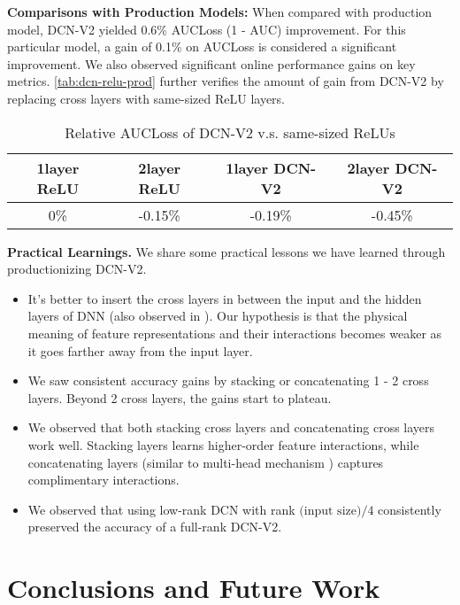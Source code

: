 \documentclass[sigconf]{acmart}
\begin{document}
{\bf Comparisons with Production Models:} When compared with production model, {DCN-V2} yielded 0.6\% AUCLoss (1 - AUC) improvement. For this particular model, a gain of 0.1\% on AUCLoss is considered a significant improvement.  We also observed significant online performance gains on key metrics.
\autoref{tab:dcn-relu-prod} further verifies the amount of gain from {DCN-V2} by replacing cross layers with same-sized ReLU layers.

\begin{table}[htpb]
\small
    \caption{Relative AUCLoss of {DCN-V2} v.s. same-sized ReLUs}
    \label{tab:dcn-relu-prod}
    \vspace{-3ex}
        \centering
        \begin{tabular}{cccc}
        \toprule
        { 1layer ReLU}  & {2layer ReLU} & {1layer {DCN-V2}} & {2layer {DCN-V2}}\\
        \midrule
         0\%   & -0.15\% & -0.19\% &  -0.45\% \\
        \bottomrule
        \end{tabular}
\end{table}

{\bf Practical Learnings.} We share some practical lessons we have learned through productionizing {DCN-V2}. 
\begin{itemize}[leftmargin=1em]
\item It's better to insert the cross layers in between the input and the hidden layers of DNN (also observed in \cite{shan2016deep}). Our hypothesis is that the physical meaning of feature representations and their interactions becomes weaker as it goes farther away from the input layer.
\item We saw consistent accuracy gains by stacking or concatenating 1 - 2 cross layers. Beyond 2 cross layers, the gains start to plateau.
\item We observed that both stacking cross layers and concatenating cross layers work well. Stacking layers learns higher-order feature interactions, while concatenating layers (similar to multi-head mechanism \cite{vaswani2017attention}) captures complimentary interactions.
\item We observed that using low-rank DCN with rank $\text{(input size)}/4$ consistently preserved the accuracy of a full-rank {DCN-V2}.  
\end{itemize}


\section{Conclusions and Future Work}
\end{document}
